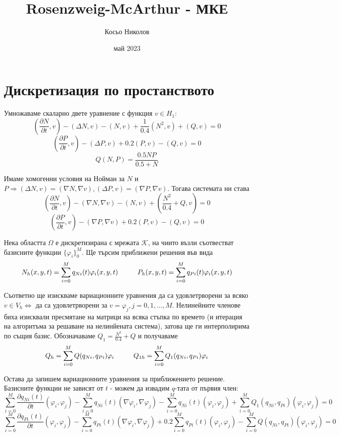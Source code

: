 \documentclass[fleqn,12pt]{article}
\title{Rosenzweig-McArthur - МКЕ}
\author{Косьо Николов}
\date{май 2023}
\begin{document}
    
\maketitle

\tableofcontents
\pagebreak

\section{Дискретизация по простанството}
Умножаваме скаларно двете уравнение с функция $v \in H_1$:
\[ \left(\frac{\partial N}{\partial t}, v\right) - (\Delta N, v) - (N, v) + \frac{1}{0.4} (N^2, v) + (Q, v) = 0\]
\[ \left(\frac{\partial P}{\partial t}, v\right) - (\Delta P, v) + 0.2(P, v) - (Q, v) = 0\]
\[ Q(N, P) = \frac{0.5 NP}{0.5 + N}\]

Имаме хомогенни условия на Нойман за $N$ и $P \Rightarrow (\Delta N, v) = (\nabla N, \nabla v), (\Delta P, v) = (\nabla P, \nabla v)$. 
Тогава системата ни става
\[ \left(\frac{\partial N}{\partial t}, v\right) - (\nabla N, \nabla v) - (N, v) + \left(\frac{N^2}{0.4}  + Q, v\right) = 0\]
\[ \left(\frac{\partial P}{\partial t}, v\right) - (\nabla P, \nabla v) + 0.2(P, v) - (Q, v) = 0\]

Нека областта $\Omega$ е дискретизирана с мрежата $\mathcal{K}$, на чиито възли съотвестват базисните функции
$\{\varphi_i\}_0^M$. Ще търсим приближени решения във вида
\[ N_h(x,y,t) = \sum_{i=0}^M q_{Ni}(t) \varphi_i(x,y,t) \hspace{10mm}
P_h(x,y,t) = \sum_{i=0}^M q_{Pi}(t) \varphi_i(x,y,t) \]

Съответно ще изискваме вариационните уравнения да са удовлетрворени за всяко $v \in V_h \Leftrightarrow$
да са удовлетрворени за $v = \varphi_j, j = 0, 1, \dots, M$.
Нелинейните членове биха изисквали пресмятане на матрици на всяка стъпка по времето (и итерация на алгоритъма за решаване на нелинйената система),
затова ще ги интерполирима по същия базис. Обозначаваме $Q_1 = \frac{N^2}{0.4} + Q$ и получаваме
\[ Q_h = \sum_{i=0}^M Q(q_{Ni}, q_{Pi}) \varphi_i \hspace{10mm}
Q_{1h} = \sum_{i=0}^M Q_1(q_{Ni}, q_{Pi}) \varphi_i \]

Остава да запишем вариационните уравнения за приближението решение. Базисните функции не зависят от $t$ - можем да
извадим $q$-тата от първия член:
\[ \sum_{i=0}^M \frac{\partial q_{Ni}(t)}{\partial t} (\varphi_i, \varphi_j) - \sum_{i=0}^M q_{Ni}(t) (\nabla \varphi_i, \nabla \varphi_j) - \sum_{i=0}^M q_{Ni}(t) (\varphi_i, \varphi_j) + \sum_{i=0}^M Q_1(q_{Ni}, q_{Pi})(\varphi_i, \varphi_j) = 0\]
\[ \sum_{i=0}^M \frac{\partial q_{Pi}(t)}{\partial t} (\varphi_i, \varphi_j) - \sum_{i=0}^M q_{Pi}(t) (\nabla \varphi_i, \nabla \varphi_j) + 0.2\sum_{i=0}^M q_{Pi}(t) (\varphi_i, \varphi_j) - \sum_{i=0}^M Q(q_{Ni}, q_{Pi})(\varphi_i, \varphi_j) = 0\]
\end{document}
